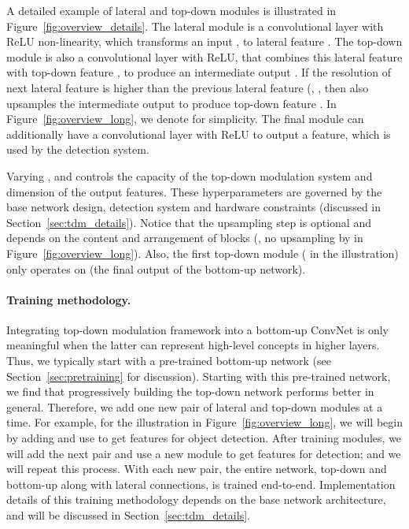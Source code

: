 \documentclass[10pt,twocolumn,letterpaper]{article}
\begin{document}
A detailed example of lateral and top-down modules is illustrated in Figure~\ref{fig:overview_details}. The lateral module  is a  convolutional layer with ReLU non-linearity, which transforms an  input , to  lateral feature . The top-down module  is also a  convolutional layer with ReLU, that combines this lateral feature with  top-down feature , to produce an intermediate output . If the resolution of next lateral feature  is higher than the previous lateral feature (\eg, , then  also upsamples the intermediate output to produce  top-down feature . In Figure~\ref{fig:overview_long}, we denote  for simplicity. The final  module can additionally have a  convolutional layer with ReLU to output a  feature, which is used by the detection system. 

Varying ,  and  controls the capacity of the top-down modulation system and dimension of the output features. These hyperparameters are governed by the base network design, detection system and hardware constraints (discussed in Section~\ref{sec:tdm_details}). Notice that the upsampling step is optional and depends on the content and arrangement of  blocks (\eg, no upsampling by  in Figure~\ref{fig:overview_long}). Also, the first top-down module ( in the illustration) only operates on  (the final output of the bottom-up network). 

\vspace{-0.1in}
\paragraph{Training methodology.} Integrating top-down modulation framework into a bottom-up ConvNet is only meaningful when the latter can represent high-level concepts in higher layers. Thus, we typically start with a pre-trained bottom-up network (see Section~\ref{sec:pretraining} for discussion). Starting with this pre-trained network, we find that progressively building the top-down network performs better in general. Therefore, we add one new pair of lateral and top-down modules at a time. For example, for the illustration in Figure~\ref{fig:overview_long}, we will begin by adding  and use  to get features for object detection. After training  modules, we will add the next pair  and use a new  module to get features for detection; and we will repeat this process. With each new pair, the entire network, top-down and bottom-up along with lateral connections, is trained end-to-end. Implementation details of this training methodology depends on the base network architecture, and will be discussed in Section~\ref{sec:tdm_details}.
\end{document}
